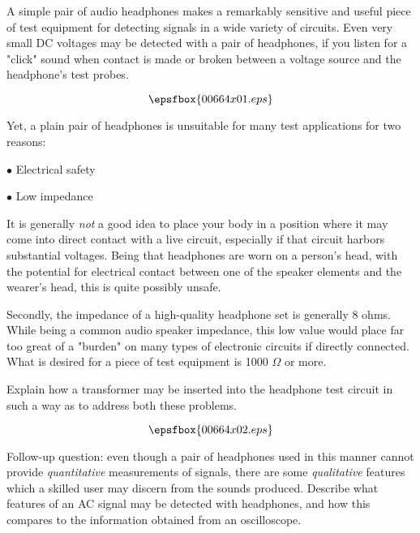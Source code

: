 

A simple pair of audio headphones makes a remarkably sensitive and useful piece of test equipment for detecting signals in a wide variety of circuits.  Even very small DC voltages may be detected with a pair of headphones, if you listen for a "click" sound when contact is made or broken between a voltage source and the headphone's test probes.

$$\epsfbox{00664x01.eps}$$

Yet, a plain pair of headphones is unsuitable for many test applications for two reasons:

\medskip
\item{$\bullet$} Electrical safety
\item{$\bullet$} Low impedance
\medskip

It is generally {\it not} a good idea to place your body in a position where it may come into direct contact with a live circuit, especially if that circuit harbors substantial voltages.  Being that headphones are worn on a person's head, with the potential for electrical contact between one of the speaker elements and the wearer's head, this is quite possibly unsafe.

Secondly, the impedance of a high-quality headphone set is generally 8 ohms.  While being a common audio speaker impedance, this low value would place far too great of a "burden" on many types of electronic circuits if directly connected.  What is desired for a piece of test equipment is 1000 $\Omega$ or more.

Explain how a transformer may be inserted into the headphone test circuit in such a way as to address both these problems.







$$\epsfbox{00664x02.eps}$$

\vskip 10pt

Follow-up question: even though a pair of headphones used in this manner cannot provide {\it quantitative} measurements of signals, there are some {\it qualitative} features which a skilled user may discern from the sounds produced.  Describe what features of an AC signal may be detected with headphones, and how this compares to the information obtained from an oscilloscope.

